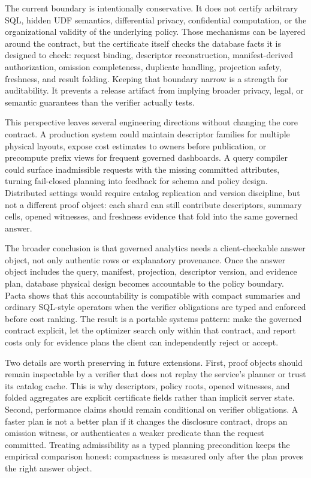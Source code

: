 \documentclass[conference]{IEEEtran}
\newcommand{\sys}{Pacta\xspace}
\begin{document}
The current boundary is intentionally conservative. It does not certify arbitrary SQL, hidden UDF semantics, differential privacy, confidential computation, or the organizational validity of the underlying policy. Those mechanisms can be layered around the contract, but the certificate itself checks the database facts it is designed to check: request binding, descriptor reconstruction, manifest-derived authorization, omission completeness, duplicate handling, projection safety, freshness, and result folding. Keeping that boundary narrow is a strength for auditability. It prevents a release artifact from implying broader privacy, legal, or semantic guarantees than the verifier actually tests.

This perspective leaves several engineering directions without changing the core contract. A production system could maintain descriptor families for multiple physical layouts, expose cost estimates to owners before publication, or precompute prefix views for frequent governed dashboards. A query compiler could surface inadmissible requests with the missing committed attributes, turning fail-closed planning into feedback for schema and policy design. Distributed settings would require catalog replication and version discipline, but not a different proof object: each shard can still contribute descriptors, summary cells, opened witnesses, and freshness evidence that fold into the same governed answer.

The broader conclusion is that governed analytics needs a client-checkable answer object, not only authentic rows or explanatory provenance. Once the answer object includes the query, manifest, projection, descriptor version, and evidence plan, database physical design becomes accountable to the policy boundary. \sys shows that this accountability is compatible with compact summaries and ordinary SQL-style operators when the verifier obligations are typed and enforced before cost ranking. The result is a portable systems pattern: make the governed contract explicit, let the optimizer search only within that contract, and report costs only for evidence plans the client can independently reject or accept.

Two details are worth preserving in future extensions. First, proof objects should remain inspectable by a verifier that does not replay the service's planner or trust its catalog cache. This is why descriptors, policy roots, opened witnesses, and folded aggregates are explicit certificate fields rather than implicit server state. Second, performance claims should remain conditional on verifier obligations. A faster plan is not a better plan if it changes the disclosure contract, drops an omission witness, or authenticates a weaker predicate than the request committed. Treating admissibility as a typed planning precondition keeps the empirical comparison honest: compactness is measured only after the plan proves the right answer object.
\end{document}
